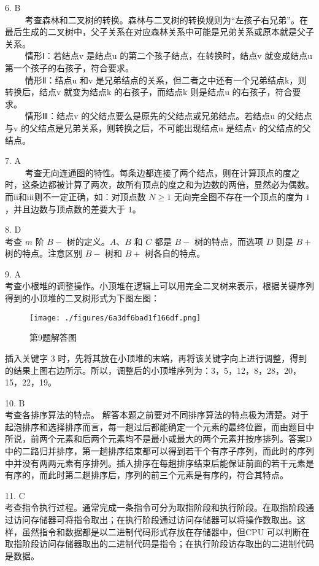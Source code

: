 6. B \\
$\qquad$ 考查森林和二叉树的转换。森林与二叉树的转换规则为“左孩子右兄弟”。在最后生成的二叉树中，父子关系在对应森林关系中可能是兄弟关系或原本就是父子关系。 \\
$\qquad$ 情形Ⅰ：若结点v 是结点u 的第二个孩子结点，在转换时，结点v 就变成结点u 第一个孩子的右孩子，符合要求。 \\
$\qquad$ 情形Ⅱ：结点u 和v 是兄弟结点的关系，但二者之中还有一个兄弟结点k，则转换后，结点v 就变为结点k 的右孩子，而结点k 则是结点u 的右孩子，符合要求。 \\
$\qquad$ 情形Ⅲ：结点v 的父结点要么是原先的父结点或兄弟结点。若结点u 的父结点与v 的父结点是兄弟关系，则转换之后，不可能出现结点u 是结点v 的父结点的父结点。

7. A \\
$\qquad$ 考查无向连通图的特性。每条边都连接了两个结点，则在计算顶点的度之时，这条边都被计算了两次，故所有顶点的度之和为边数的两倍，显然必为偶数。而ii和iii则不一定正确，如：对顶点数 $N\geqslant1$ 无向完全图不存在一个顶点的度为 $1$，并且边数与顶点数的差要大于 $1$。

8. D \\
考查 $m$ 阶 $B-$ 树的定义。$A$、$B$ 和 $C$ 都是 $B-$ 树的特点，而选项 $D$ 则是 $B+$ 树的特点。注意区别 $B-$ 树和 $B+$ 树各自的特点。

9. A \\
考查小根堆的调整操作。小顶堆在逻辑上可以用完全二叉树来表示，根据关键序列得到的小顶堆的二叉树形式为下图左图：
\begin{figure}[ht]
\centering
\texttt{[image: ./figures/6a3df6bad1f166df.png]}
\caption{第9题解答图} \label{fig_CSN09_5}
\end{figure}
插入关键字 3 时，先将其放在小顶堆的末端，再将该关键字向上进行调整，得到的结果上图右边所示。所以，调整后的小顶堆序列为：3，5，12，8，28，20，15，22，19。

10. B \\
考查各排序算法的特点。
解答本题之前要对不同排序算法的特点极为清楚。对于起泡排序和选择排序而言，每一趟过后都能确定一个元素的最终位置，而由题目中所说，前两个元素和后两个元素均不是最小或最大的两个元素并按序排列。答案D 中的二路归并排序，第一趟排序结束都可以得到若干个有序子序列，而此时的序列中并没有两两元素有序排列。插入排序在每趟排序结束后能保证前面的若干元素是有序的，而此时第二趟排序后，序列的前三个元素是有序的，符合其特点。

11. C \\
考查指令执行过程。通常完成一条指令可分为取指阶段和执行阶段。在取指阶段通过访问存储器可将指令取出；在执行阶段通过访问存储器可以将操作数取出。这样，虽然指令和数据都是以二进制代码形式存放在存储器中，但CPU 可以判断在取指阶段访问存储器取出的二进制代码是指令；在执行阶段访存取出的二进制代码是数据。

